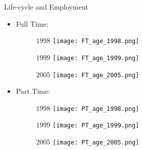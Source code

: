 \documentclass{beamer}
\begin{document}
\begin{frame}{Life-cycle and Employment}
\begin{itemize}
\item Full Time:
\begin{figure}
\begin{minipage}[b]{0.3\textwidth}{$1998$}
\centering
\texttt{[image: FT\_age\_1998.png]}
\end{minipage}
\begin{minipage}[b]{0.3\textwidth}{$1999$}
\centering
\texttt{[image: FT\_age\_1999.png]}
\end{minipage}
\begin{minipage}[b]{0.3\textwidth}{$2005$}
\centering
\texttt{[image: FT\_age\_2005.png]}
\end{minipage}
\end{figure}
\item Part Time:
\begin{figure}
\begin{minipage}[b]{0.3\textwidth}{$1998$}
\centering
\texttt{[image: PT\_age\_1998.png]}
\end{minipage}
\begin{minipage}[b]{0.3\textwidth}{$1999$}
\centering
\texttt{[image: PT\_age\_1999.png]}
\end{minipage}
\begin{minipage}[b]{0.3\textwidth}{$2005$}
\centering
\texttt{[image: PT\_age\_2005.png]}
\end{minipage}
\end{figure}
\end{itemize}
\end{frame}
\end{document}
